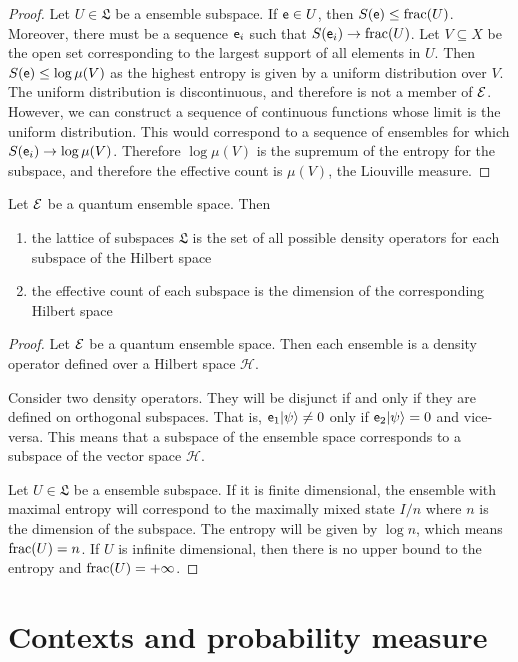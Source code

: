 \begin{proof}
	Let $U \in \mathfrak{L}$ be a ensemble subspace. If $\mathsf{e} \in U$, then $S(\mathsf{e}) \leq \mathrm{frac}(U)$. Moreover, there must be a sequence $\mathsf{e}_i$ such that $S(\mathsf{e}_i) \to \mathrm{frac}(U)$. Let $V \subseteq X$ be the open set corresponding to the largest support of all elements in $U$. Then $S(\mathsf{e}) \leq \log \mu(V)$ as the highest entropy is given by a uniform distribution over $V$. The uniform distribution is discontinuous, and therefore is not a member of $\mathcal{E}$. However, we can construct a sequence of continuous functions whose limit is the uniform distribution. This would correspond to a sequence of ensembles for which $S(\mathsf{e}_i) \to \log \mu(V)$. Therefore $\log \mu(V)$ is the supremum of the entropy for the subspace, and therefore the effective count is $\mu(V)$, the Liouville measure.
\end{proof}

\begin{conj}
	Let $\mathcal{E}$ be a quantum ensemble space. Then
	\begin{enumerate}
		\item the lattice of subspaces $\mathfrak{L}$ is the set of all possible density operators for each subspace of the Hilbert space
		\item the effective count of each subspace is the dimension of the corresponding Hilbert space
	\end{enumerate}
\end{conj}

\begin{proof}
	Let $\mathcal{E}$ be a quantum ensemble space. Then each ensemble is a density operator defined over a Hilbert space $\mathcal{H}$.
	
	Consider two density operators. They will be disjunct if and only if they are defined on orthogonal subspaces. That is, $\mathsf{e}_1 | \psi \rangle \neq 0$ only if $\mathsf{e}_2 | \psi \rangle = 0$ and vice-versa. This means that a subspace of the ensemble space corresponds to a subspace of the vector space $\mathcal{H}$.
	
	Let $U \in \mathfrak{L}$ be a ensemble subspace. If it is finite dimensional, the ensemble with maximal entropy will correspond to the maximally mixed state $I/n$ where $n$ is the dimension of the subspace. The entropy will be given by $\log n$, which means $\mathrm{frac}(U) = n$. If $U$ is infinite dimensional, then there is no upper bound to the entropy and $\mathrm{frac}(U) = + \infty$.
\end{proof}

\section{Contexts and probability measure}

